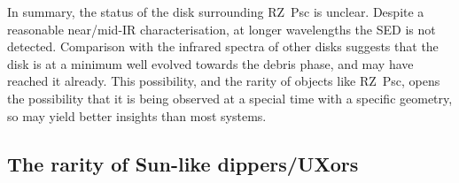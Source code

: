 \documentclass[]{rsos}
\begin{document}
In summary, the status of the disk surrounding RZ~Psc is unclear. Despite a reasonable
near/mid-IR characterisation, at longer wavelengths the SED is not detected. Comparison
with the infrared spectra of other disks suggests that the disk is at a minimum well
evolved towards the debris phase, and may have reached it already. This possibility, and
the rarity of objects like RZ~Psc, opens the possibility that it is being observed at a
special time with a specific geometry, so may yield better insights than most systems.

\subsection{The rarity of Sun-like dippers/UXors}\label{ss:rarity}

\end{document}
